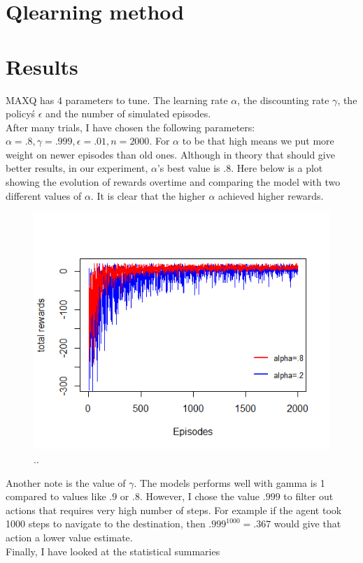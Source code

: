 \documentclass[twoside,twocolumn]{article}
\begin{document}
\section{Qlearning method}
\section{Results}
MAXQ has 4 parameters to tune. The learning rate $\alpha$, the discounting rate $\gamma$, the policy\'s $\epsilon$ and the number of simulated episodes.\\
After many trials, I have chosen the following parameters: $\alpha=.8, \gamma=.999, \epsilon=.01, n=2000$. For $\alpha$ to be that high means we put more weight on newer episodes than old ones. Although in theory that should give better results, in our experiment, $\alpha$'s best value is .8. Here below is a plot showing the evolution of rewards overtime and comparing the model with two different values of $\alpha$. It is clear that the higher $\alpha$ achieved higher rewards.\\
 
\begin{figure}[hbtp]
\centering
\includegraphics[scale=.8]{RplotHL2.png}
\caption{..}
\end{figure}
Another note is the value of $\gamma$. The models performs well with gamma is 1 compared to values like $.9$ or $.8$. However, I chose the value $.999$ to filter out actions that requires very high number of steps. For example if the agent took 1000 steps to navigate to the destination, then $.999^{1000}=.367$ would give that action a lower value estimate.\\
Finally, I have looked at the statistical summaries \\
\end{document}
